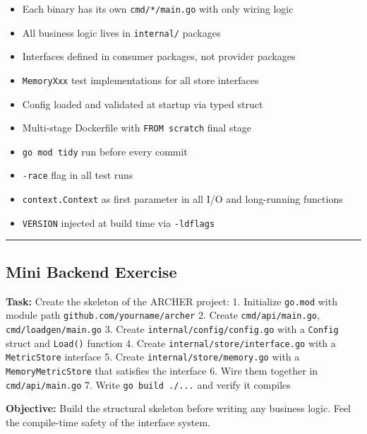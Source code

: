 \documentclass[11pt,openany]{book}
\providecommand{\tightlist}{%
  \setlength{\itemsep}{0pt}\setlength{\parskip}{0pt}}
\begin{document}
\begin{itemize}
\tightlist
\item[$\square$]
  Each binary has its own \texttt{cmd/*/main.go} with only wiring logic
\item[$\square$]
  All business logic lives in \texttt{internal/} packages
\item[$\square$]
  Interfaces defined in consumer packages, not provider packages
\item[$\square$]
  \texttt{MemoryXxx} test implementations for all store interfaces
\item[$\square$]
  Config loaded and validated at startup via typed struct
\item[$\square$]
  Multi-stage Dockerfile with \texttt{FROM\ scratch} final stage
\item[$\square$]
  \texttt{go\ mod\ tidy} run before every commit
\item[$\square$]
  \texttt{-race} flag in all test runs
\item[$\square$]
  \texttt{context.Context} as first parameter in all I/O and
  long-running functions
\item[$\square$]
  \texttt{VERSION} injected at build time via \texttt{-ldflags}
\end{itemize}

\begin{center}\rule{0.5\linewidth}{0.5pt}\end{center}

\hypertarget{mini-backend-exercise-1}{%
\subsection{Mini Backend Exercise}\label{mini-backend-exercise-1}}

\textbf{Task:} Create the skeleton of the ARCHER project: 1. Initialize
\texttt{go.mod} with module path \texttt{github.com/yourname/archer} 2.
Create \texttt{cmd/api/main.go}, \texttt{cmd/loadgen/main.go} 3. Create
\texttt{internal/config/config.go} with a \texttt{Config} struct and
\texttt{Load()} function 4. Create \texttt{internal/store/interface.go}
with a \texttt{MetricStore} interface 5. Create
\texttt{internal/store/memory.go} with a \texttt{MemoryMetricStore} that
satisfies the interface 6. Wire them together in
\texttt{cmd/api/main.go} 7. Write \texttt{go\ build\ ./...} and verify
it compiles

\textbf{Objective:} Build the structural skeleton before writing any
business logic. Feel the compile-time safety of the interface system.
\end{document}
